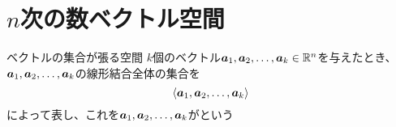 \documentclass[../../../topic_vector]{subfiles}
\begin{document}
\sectionline
\section{$n$次の数ベクトル空間}

\begin{definition}{ベクトルの集合が張る空間}
  $k$個のベクトル$\vb*{a}_1, \vb*{a}_2, \dots, \vb*{a}_k \in \mathbb{R}^n$を与えたとき、$\vb*{a}_1, \vb*{a}_2, \dots, \vb*{a}_k$の線形結合全体の集合を
  \begin{equation*}
    \langle \vb*{a}_1, \vb*{a}_2, \dots, \vb*{a}_k \rangle
  \end{equation*}
  によって表し、これを$\vb*{a}_1, \vb*{a}_2, \dots, \vb*{a}_k$がという
\end{definition}
\end{document}
